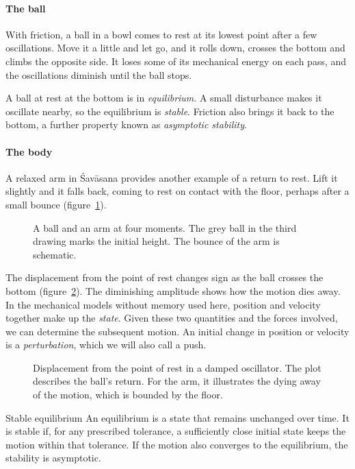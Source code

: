 \paragraph{The ball} With friction, a ball in a bowl comes to rest at its lowest point after a few oscillations. Move it a little and let go, and it rolls down, crosses the bottom and climbs the opposite side. It loses some of its mechanical energy on each pass, and the oscillations diminish until the ball stops.

A ball at rest at the bottom is in \emph{equilibrium}. A small disturbance makes it oscillate nearby, so the equilibrium is \emph{stable}. Friction also brings it back to the bottom, a further property known as \emph{asymptotic stability}.

\paragraph{The body} A relaxed arm in Śavāsana provides another example of a return to rest. Lift it slightly and it falls back, coming to rest on contact with the floor, perhaps after a small bounce (figure~\ref{fig:tornare}).

\begin{figure}
\caption{A ball and an arm at four moments. The grey ball in the third drawing marks the initial height. The bounce of the arm is schematic.}
\label{fig:tornare}
\end{figure}

The displacement from the point of rest changes sign as the ball crosses the bottom (figure~\ref{fig:onda}). The diminishing amplitude shows how the motion dies away. In the mechanical models without memory used here, position and velocity together make up the \emph{state}. Given these two quantities and the forces involved, we can determine the subsequent motion. An initial change in position or velocity is a \emph{perturbation}, which we will also call a push.

\begin{figure}
\caption{Displacement from the point of rest in a damped oscillator. The plot describes the ball's return. For the arm, it illustrates the dying away of the motion, which is bounded by the floor.}
\label{fig:onda}
\end{figure}

\begin{parola}{Stable equilibrium}
An equilibrium is a state that remains unchanged over time. It is stable if, for any prescribed tolerance, a sufficiently close initial state keeps the motion within that tolerance. If the motion also converges to the equilibrium, the stability is asymptotic.
\end{parola}

